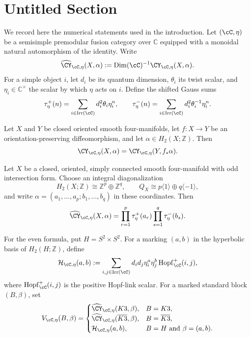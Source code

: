 \section{Untitled Section}

We record here the numerical statements used in the introduction.  Let
$(\cC,\eta)$ be a semisimple premodular fusion category over $\mathbb C$
equipped with a monoidal natural automorphism of the identity.  Write
\[
  \widehat{\CY}_{\cC,\eta}(X,\alpha)
  := \operatorname{Dim}(\cC)^{-1}\CY_{\cC,\eta}(X,\alpha).
\]
For a simple object $i$, let $d_i$ be its quantum dimension, $\theta_i$ its
twist scalar, and $\eta_i\in\mathbb C^\times$ the scalar by which $\eta$ acts
on $i$.  Define the shifted Gauss sums
\[
  \tau_\eta^+(n)=\sum_{i\in\operatorname{Irr}(\cC)}d_i^2\theta_i\eta_i^n,
  \qquad
  \tau_\eta^-(n)=\sum_{i\in\operatorname{Irr}(\cC)}d_i^2\theta_i^{-1}\eta_i^n.
\]

\begin{proposition}
\label{prop:diffeomorphism-invariance}
Let $X$ and $Y$ be closed oriented smooth four-manifolds, let
$f\colon X\to Y$ be an orientation-preserving diffeomorphism, and let
$\alpha\in H_2(X;\mathbb Z)$.  Then
\[
  \CY_{\cC,\eta}(X,\alpha)
  =\CY_{\cC,\eta}(Y,f_*\alpha).
\]
\end{proposition}

\begin{proposition}\label{prop:odd-formula}
Let $X$ be a closed, oriented, simply connected smooth four-manifold with odd
intersection form.  Choose an integral diagonalization
\[
  H_2(X;\mathbb Z)\cong
  \mathbb Z^p\oplus\mathbb Z^q,
  \qquad
  Q_X\cong p\langle 1\rangle\oplus q\langle-1\rangle,
\]
and write $\alpha=(a_1,\ldots,a_p;b_1,\ldots,b_q)$ in these coordinates.
Then
\[
  \widehat{\CY}_{\cC,\eta}(X,\alpha)
  =\prod_{r=1}^{p}\tau_\eta^+(a_r)
   \prod_{s=1}^{q}\tau_\eta^-(b_s).
\]
\end{proposition}

For the even formula, put $H=S^2\times S^2$.  For a marking $(a,b)$ in the
hyperbolic basis of $H_2(H;\mathbb Z)$, define
\[
  \mathcal H_{\cC,\eta}(a,b)
  :=\sum_{i,j\in\operatorname{Irr}(\cC)}
      d_i d_j\eta_i^a\eta_j^b
      \operatorname{Hopf}_{\cC}^{+}(i,j),
\]
where $\operatorname{Hopf}_{\cC}^{+}(i,j)$ is the positive Hopf-link scalar.
For a marked standard block $(B,\beta)$, set
\[
  V_{\cC,\eta}(B,\beta)=
  \begin{cases}
    \widehat{\CY}_{\cC,\eta}(K3,\beta),&B=K3,\\
    \widehat{\CY}_{\cC,\eta}(\overline{K3},\beta),&B=\overline{K3},\\
    \mathcal H_{\cC,\eta}(a,b),&B=H\text{ and }\beta=(a,b).
  \end{cases}
\]


